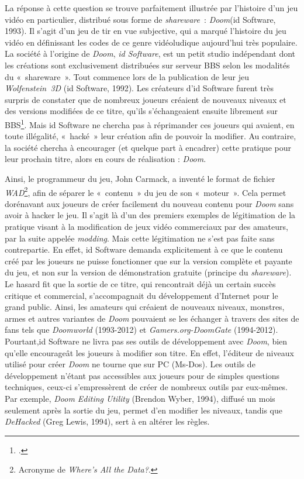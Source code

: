\documentclass{FramateX}
\begin{document}
\begin{refsection}
La réponse à cette question se trouve parfaitement illustrée par
l'histoire d'un jeu vidéo en particulier, distribué sous forme de
\textit{shareware~}: \textit{Doom}(id Software, 1993). Il s'agit d'un jeu de tir en vue subjective, qui a
marqué l'histoire du jeu vidéo en définissant les codes de ce genre
vidéoludique aujourd'hui très populaire. La société à l'origine de
 \textit{Doom},
\textit{id Software}, est un petit studio
indépendant dont les créations sont exclusivement distribuées sur
serveur BBS selon les modalités du «~shareware~». Tout commence lors de
la publication de leur jeu
\textit{Wolfenstein~3D} (id Software, 1992).
Les créateurs d'id Software furent
très surpris de constater que de nombreux joueurs créaient de nouveaux
niveaux et des versions modifiées de ce titre, qu'ils s'échangeaient
ensuite librement sur BBS\footnote{\cite{kushnermasters2004}.}. Mais id Software ne chercha pas à réprimander ces joueurs qui avaient, en toute illégalité, «~hacké~»
leur création afin de pouvoir la modifier. Au contraire, la société
chercha à encourager (et quelque part à encadrer) cette pratique pour
leur prochain titre, alors en cours de réalisation : \textit{Doom}. 


Ainsi, le programmeur du jeu, John Carmack, a inventé le format de
fichier \textit{WAD}\footnote{Acronyme
de \textit{Where's All the Data?}.}, afin de
séparer le «~contenu~» du jeu de son «~moteur~». Cela permet dorénavant
aux joueurs de créer facilement du nouveau contenu pour \textit{Doom} sans avoir à hacker le jeu. Il s'agit là d'un des premiers exemples de légitimation de la pratique
visant à la modification de jeux vidéo commerciaux par des amateurs,
par la suite appelée \textit{modding}. Mais
cette légitimation ne s'est pas faite sans contrepartie. En effet, id Software demanda explicitement à
ce que le contenu créé par les joueurs ne puisse fonctionner que sur la
version complète et payante du jeu, et non sur la version de
démonstration gratuite (principe du \textit{shareware}). Le hasard fit que
la sortie de ce titre, qui rencontrait déjà un certain succès critique
et commercial, s'accompagnait du développement d'Internet pour le grand
public. Ainsi, les amateurs qui créaient de nouveaux niveaux, monstres,
armes et autres variantes de \textit{Doom}
pouvaient se les échanger à travers des sites de fans tels que \textit{Doomworld} (1993-2012) et \textit{Gamers.org-DoomGate} (1994-2012). 
Pourtant,id Software ne livra pas
ses outils de développement avec \textit{Doom}, bien qu'elle encourageât les
joueurs à modifier son titre. En effet, l'éditeur de niveaux utilisé
pour créer \textit{Doom} ne tourne que sur PC (Ms-Dos). Les outils de
développement n'étant pas accessibles aux joueurs pour de simples
questions techniques, ceux-ci s'empressèrent de créer de nombreux
outils par eux-mêmes. Par exemple, \textit{Doom Editing Utility} (Brendon Wyber,
1994), diffusé un mois seulement après la sortie du jeu, permet d'en
modifier les niveaux, tandis que \textit{DeHacked} (Greg Lewis, 1994), sert à
en altérer les règles.



\end{refsection}
\end{document}
